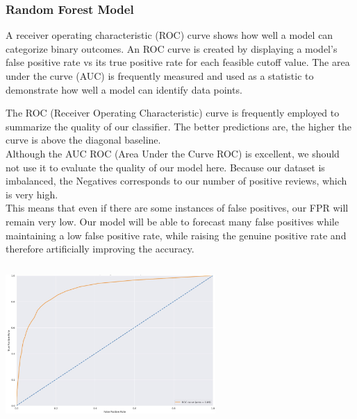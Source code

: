 \subsubsection{Random Forest Model}

A receiver operating characteristic (ROC) curve shows how well a model can categorize binary outcomes. An ROC curve is created by displaying a model's false positive rate vs its true positive rate for each feasible cutoff value. The area under the curve (AUC) is frequently measured and used as a statistic to demonstrate how well a model can identify data points.

The ROC (Receiver Operating Characteristic) curve is frequently employed to summarize the quality of our classifier. The better predictions are, the higher the curve is above the diagonal baseline. \\
Although the AUC ROC (Area Under the Curve ROC) is excellent, we should not use it to evaluate the quality of our model here. Because our dataset is imbalanced, the  Negatives corresponds to our number of positive reviews, which is very high. \\
This means that even if there are some instances of false positives, our FPR will remain very low. Our model will be able to forecast many false positives while maintaining a low false positive rate, while raising the genuine positive rate and therefore artificially improving the accuracy.




\includegraphics[width=8cm, height=6cm ]{roc.jpeg}

